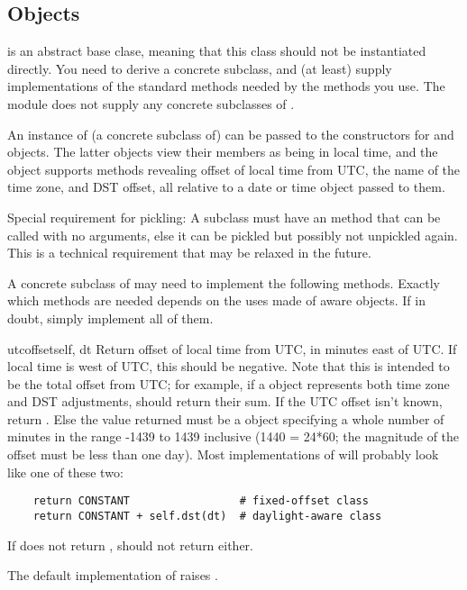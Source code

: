 \subsection{ Objects \label{datetime-tzinfo}}

 is an abstract base clase, meaning that this class
should not be instantiated directly.  You need to derive a concrete
subclass, and (at least) supply implementations of the standard
 methods needed by the  methods you
use.  The  module does not supply any concrete
subclasses of .

An instance of (a concrete subclass of)  can be passed
to the constructors for  and  objects.
The latter objects view their members as being in local time, and the
 object supports methods revealing offset of local time
from UTC, the name of the time zone, and DST offset, all relative to a
date or time object passed to them.

Special requirement for pickling:  A  subclass must have an
 method that can be called with no arguments, else it
can be pickled but possibly not unpickled again.  This is a technical
requirement that may be relaxed in the future.

A concrete subclass of  may need to implement the
following methods.  Exactly which methods are needed depends on the
uses made of aware  objects.  If in doubt, simply
implement all of them.

\begin{methoddesc}{utcoffset}{self, dt}
  Return offset of local time from UTC, in minutes east of UTC.  If
  local time is west of UTC, this should be negative.  Note that this
  is intended to be the total offset from UTC; for example, if a
   object represents both time zone and DST adjustments,
   should return their sum.  If the UTC offset
  isn't known, return .  Else the value returned must be
  a  object specifying a whole number of minutes in the
  range -1439 to 1439 inclusive (1440 = 24*60; the magnitude of the offset
  must be less than one day).  Most implementations of
   will probably look like one of these two:

\begin{verbatim}
    return CONSTANT                 # fixed-offset class
    return CONSTANT + self.dst(dt)  # daylight-aware class
\end{verbatim}

    If  does not return ,
     should not return  either.

    The default implementation of  raises
    .
\end{methoddesc}

